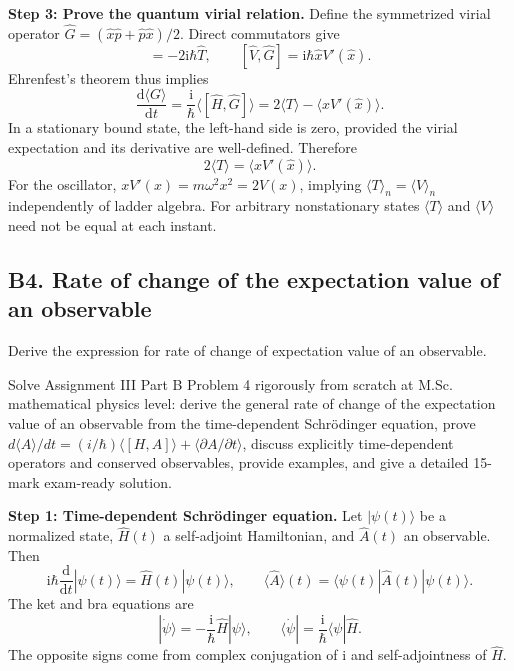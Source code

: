 \documentclass[11pt,a4paper]{article}
\newcommand{\dd}{\mathrm{d}}\newcommand{\iu}{\mathrm{i}}\newcommand{\ee}{\mathrm{e}}
\newcommand{\avg}[1]{\langle #1\rangle}\newcommand{\Sch}{Schr\"odinger}
\newcommand{\bra}[1]{\langle #1|}\newcommand{\ket}[1]{|#1\rangle}
\begin{document}
\textbf{Step 3: Prove the quantum virial relation.} Define the symmetrized virial operator \(\hat G=(\hat x\hat p+\hat p\hat x)/2\). Direct commutators give
\begin{equation}[\hat T,\hat G]=-2\iu\hbar\hat T,\qquad[\hat V,\hat G]=\iu\hbar\hat x V'(\hat x).\end{equation}
Ehrenfest's theorem thus implies
\begin{equation}\frac{\dd\avg G}{\dd t}=\frac{\iu}{\hbar}\avg{[\hat H,\hat G]}=2\avg T-\avg{xV'(\hat x)}.\end{equation}
In a stationary bound state, the left-hand side is zero, provided the virial expectation and its derivative are well-defined. Therefore
\begin{equation}\boxed{2\avg T=\avg{xV'(\hat x)}.}\end{equation}
For the oscillator, \(xV'(x)=m\omega^2x^2=2V(x)\), implying \(\avg T_n=\avg V_n\) independently of ladder algebra. For arbitrary nonstationary states \(\avg T\) and \(\avg V\) need not be equal at each instant.

\subsection{B4. Rate of change of the expectation value of an observable}
\begin{questionbox}
Derive the expression for rate of change of expectation value of an observable.
\end{questionbox}
\begin{studybox}
Solve Assignment III Part B Problem 4 rigorously from scratch at M.Sc. mathematical physics level: derive the general rate of change of the expectation value of an observable from the time-dependent Schr\"odinger equation, prove \(d\langle A\rangle/dt=(i/\hbar)\langle[H,A]\rangle+\langle\partial A/\partial t\rangle\), discuss explicitly time-dependent operators and conserved observables, provide examples, and give a detailed 15-mark exam-ready solution.
\end{studybox}
\textbf{Step 1: Time-dependent Schr\"odinger equation.} Let \(\ket{\psi(t)}\) be a normalized state, \(\hat H(t)\) a self-adjoint Hamiltonian, and \(\hat A(t)\) an observable. Then
\begin{equation}\iu\hbar\frac{\dd}{\dd t}\ket{\psi(t)}=\hat H(t)\ket{\psi(t)},\qquad\avg{\hat A}(t)=\bra{\psi(t)}\hat A(t)\ket{\psi(t)}.\end{equation}
The ket and bra equations are
\begin{equation}\ket{\dot\psi}=-\frac{\iu}{\hbar}\hat H\ket\psi,\qquad\bra{\dot\psi}=\frac{\iu}{\hbar}\bra\psi\hat H.\end{equation}
The opposite signs come from complex conjugation of \(\iu\) and self-adjointness of \(\hat H\).
\end{document}
